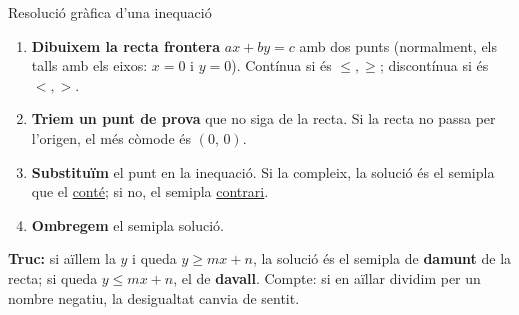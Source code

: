 \documentclass[11pt,a4paper]{article}
\begin{document}
\begin{defi}{Resolució gràfica d'una inequació}
\begin{enumerate}
\item \textbf{Dibuixem la recta frontera} $ax+by=c$ amb dos punts (normalment, els talls amb els eixos: $x=0$ i $y=0$). Contínua si és $\leq,\geq$; discontínua si és $<,>$.
\item \textbf{Triem un punt de prova} que no siga de la recta. Si la recta no passa per l'origen, el més còmode és $(0,\,0)$.
\item \textbf{Substituïm} el punt en la inequació. Si la compleix, la solució és el semipla que el \underline{conté}; si no, el semipla \underline{contrari}.
\item \textbf{Ombregem} el semipla solució.
\end{enumerate}
\end{defi}
\begin{nota}\textbf{Truc:} si aïllem la $y$ i queda $y\geq mx+n$, la solució és el semipla de \textbf{damunt} de la recta; si queda $y\leq mx+n$, el de \textbf{davall}. Compte: si en aïllar dividim per un nombre negatiu, la desigualtat canvia de sentit.\end{nota}
\end{document}
